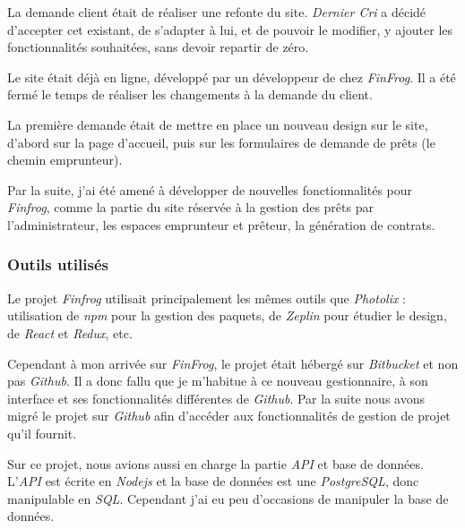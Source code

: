 \bigskip
La demande client était de réaliser une refonte du site. \emph{Dernier
Cri} a décidé d'accepter cet existant, de s'adapter à lui, et de pouvoir
le modifier, y ajouter les fonctionnalités souhaitées, sans devoir
repartir de zéro.

\bigskip

Le site était déjà en ligne, développé par un développeur de chez
\emph{FinFrog}. Il a été fermé le temps de réaliser les changements à la
demande du client.

\bigskip

La première demande était de mettre en place un nouveau design sur le
site, d'abord sur la page d'accueil, puis sur les formulaires de demande
de prêts (le chemin emprunteur).

\bigskip

Par la suite, j'ai été amené à développer de nouvelles fonctionnalités
pour \emph{Finfrog}, comme la partie du site réservée à la gestion des
prêts par l'administrateur, les espaces emprunteur et prêteur, la
génération de contrats.

\bigskip

\subsubsection{Outils utilisés}\label{outils-utilisuxe9s-1}

\bigskip

Le projet \emph{Finfrog} utilisait principalement les mêmes outils que
\emph{Photolix} : utilisation de \emph{npm} pour la gestion des paquets,
de \emph{Zeplin} pour étudier le design, de \emph{React} et
\emph{Redux}, etc.

\bigskip

Cependant à mon arrivée sur \emph{FinFrog}, le projet était hébergé sur
\emph{Bitbucket} et non pas \emph{Github}. Il a donc fallu que je
m'habitue à ce nouveau gestionnaire, à son interface et ses
fonctionnalités différentes de \emph{Github}. Par la suite nous avons
migré le projet sur \emph{Github} afin d'accéder aux fonctionnalités de
gestion de projet qu'il fournit.

\bigskip

Sur ce projet, nous avions aussi en charge la partie \emph{API} et base
de données. L'\emph{API} est écrite en \emph{Nodejs} et la base de
données est une \emph{PostgreSQL}, donc manipulable en \emph{SQL}.
Cependant j'ai eu peu d'occasions de manipuler la base de données.

\bigskip

